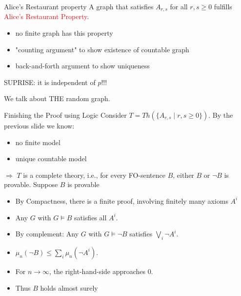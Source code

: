 \documentclass[handout]{beamer}
\renewcommand{\emph}[1]{\textcolor{red}{#1}}
\begin{document}
\begin{frame}{Alice's Restaurant property}
  A graph that satisfies $A_{r,s}$ for all $r,s\geq 0$ fulfills \emph{Alice's Restaurant Property}.

  \begin{itemize}
    \item no finite graph has this property
    \item "counting argument" to show existence of countable graph
    \item back-and-forth argument to show uniqueness

  \end{itemize}

\pause
\bigskip
  SUPRISE: it is independent of $p$!!!

\pause
  We talk about THE random graph.
\end{frame}



\begin{frame}{Finishing the Proof using Logic}
  Consider $T=Th(\{A_{r,s}\mid r,s\geq 0\})$. By the previous slide we know: 
  \begin{itemize}
    \item no finite model
    \item unique countable model
  \end{itemize}
  $\Rightarrow$ $T$ is a complete theory, \mbox{i.e.}, for every FO-sentence $B$, either $B$ or $\neg B$ is provable. Suppose $B$ is provable
  \begin{itemize}[<+->]
    \item By Compactness, there is a finite proof, involving finitely many axioms $A^i$
    \item Any $G$ with $G\models B$ satisfies all $A^i$. 
    \item By complement: Any $G$ with $G\models \neg B$ satisfies $\bigvee_i\neg A^i$.
    \item $\mu_n(\neg B)\leq \sum_i\mu_n(\neg A^i)$. 
    \item For $n\rightarrow\infty$, the right-hand-side approaches $0$.
    \item Thus $B$ holds almost surely
  \end{itemize}
\end{frame}
\end{document}
